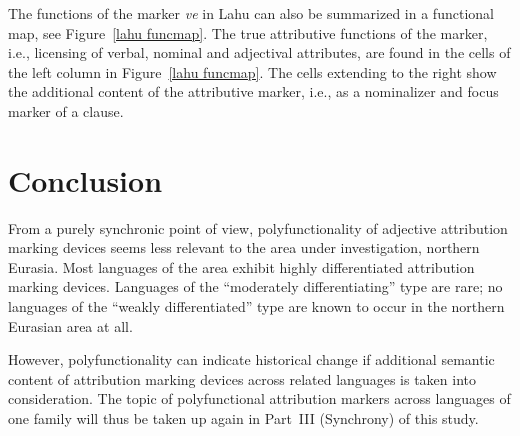 The functions of the marker \textit{ve} in Lahu can also be summarized in a functional map, see Figure~\ref{lahu funcmap}. The true attributive functions of the marker, i.e., licensing of verbal, nominal and adjectival attributes, are found in the cells of the left column in Figure~\ref{lahu funcmap}. The cells extending to the right show the additional content of the attributive marker, i.e., as a nominalizer and focus marker of a clause.

\section{Conclusion}
From a purely synchronic point of view, polyfunctionality of adjective attribution marking devices seems less relevant to the area under investigation, northern Eurasia. Most languages of the area exhibit highly differentiated attribution marking devices. Languages of the “moderately differentiating” type are rare; no languages of the “weakly differentiated” type are known to occur in the northern Eurasian area at all.

However, polyfunctionality can indicate historical change if additional semantic content of attribution marking devices across related languages is taken into consideration. The topic of polyfunctional attribution markers across languages of one family will thus be taken up again in Part~III (Synchrony) of this study.
